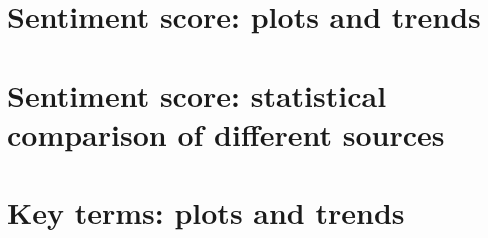 \documentclass{report}
\begin{document}

\section{Sentiment score: plots and trends} \label{Sentiment score: plots and trends}

\section{Sentiment score: statistical comparison of different sources} \label{Sentiment score: statistical comparison of different sources}


% 

\section{Key terms: plots and trends} \label{Key terms: plots and trends}




\end{document}
